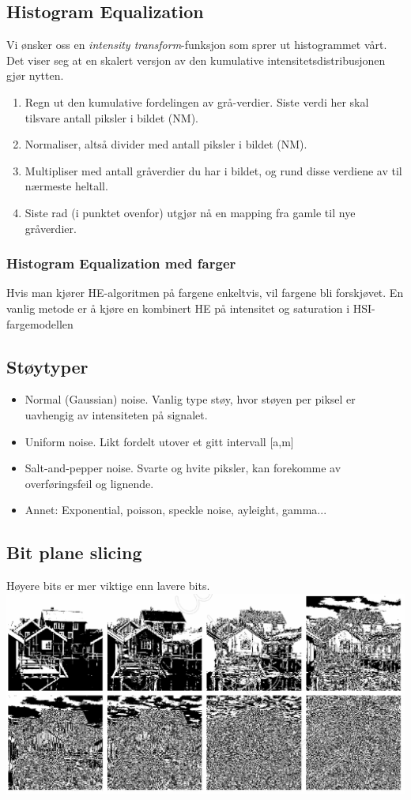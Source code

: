 \subsection{Histogram Equalization}
Vi ønsker oss en \emph{intensity transform}-funksjon som sprer ut histogrammet vårt. Det viser seg at en skalert versjon av den kumulative intensitetsdistribusjonen gjør nytten.
\begin{enumerate}
    \item Regn ut den kumulative fordelingen av grå-verdier. Siste verdi her skal tilsvare antall piksler i bildet (NM).
    \item Normaliser, altså divider med antall piksler i bildet (NM).
    \item Multipliser med antall gråverdier du har i bildet, og rund disse verdiene av til nærmeste heltall.
    \item Siste rad (i punktet ovenfor) utgjør nå en mapping fra gamle til nye gråverdier.
\end{enumerate}

\subsubsection{Histogram Equalization med farger}
Hvis man kjører HE-algoritmen på fargene enkeltvis, vil fargene bli forskjøvet. En vanlig metode er å kjøre en kombinert HE på intensitet og saturation i HSI-fargemodellen

\subsection{Støytyper}
\begin{itemize}
    \item Normal (Gaussian) noise. Vanlig type støy, hvor støyen per piksel er uavhengig av intensiteten på signalet.
    \item Uniform noise. Likt fordelt utover et gitt intervall [a,m]
    \item Salt-and-pepper noise. Svarte og hvite piksler, kan forekomme av overføringsfeil og lignende.
    \item Annet: Exponential, poisson, speckle noise, ayleight, gamma...
\end{itemize}

\subsection{Bit plane slicing}
Høyere bits er mer viktige enn lavere bits.
\\ \includegraphics[width=\textwidth]{Bilder/bitplaneslicing.png}

